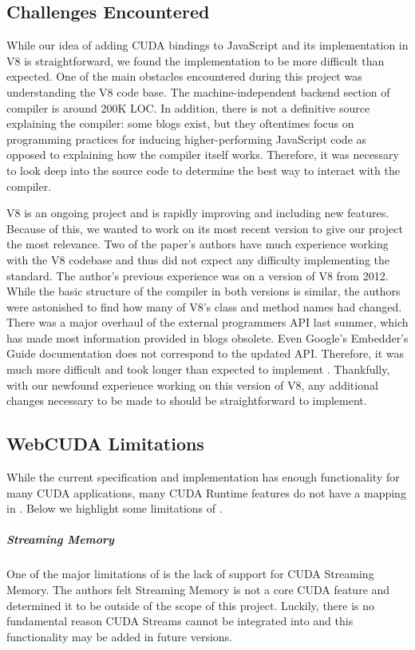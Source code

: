 

\subsection{Challenges Encountered} \label{challenges} While our idea of adding
CUDA bindings to JavaScript and its implementation in V8 is straightforward,
we found the implementation to be more difficult than expected.  One of the main obstacles
encountered during this project was understanding the V8 code base. The
machine-independent backend section of compiler is around 200K LOC. In addition,
there is not a definitive source explaining the compiler: some blogs exist, but
they oftentimes focus on programming practices for inducing higher-performing
JavaScript code as opposed to explaining how the compiler itself works.
Therefore, it was necessary to look deep into the source code to determine the
best way to interact with the compiler.

V8 is an ongoing project and is rapidly improving and including new features.
Because of this, we wanted to work on its most recent version to give our
project the most relevance.  Two of the paper's authors have much experience
working with the V8 codebase and thus did not expect any difficulty implementing
the \name standard.  The author's previous experience was on a version of V8
from 2012.  While the basic structure of the compiler in both versions is
similar, the authors were astonished to find how many of V8's class and method
names had changed. There was a major overhaul of the external programmers API
last summer, which has made most information provided in blogs obsolete. Even
Google's Embedder's Guide documentation \cite{embeddersGuide} does not
correspond to the updated API.  Therefore, it was much more difficult and took
longer than expected to implement \namens. Thankfully, with our newfound
experience working on this version of V8, any additional changes necessary to be
made to \name should be straightforward to implement.

\subsection{WebCUDA Limitations}
While the current \name specification and implementation has enough
functionality for many CUDA applications, many CUDA Runtime features do not
have a mapping in \namens. Below we highlight some limitations of \namens.

\subparagraph{Streaming Memory} One of the major limitations of \name is the
lack of support for CUDA Streaming Memory. The authors felt Streaming Memory is
not a core CUDA feature and determined it to be outside of the scope of this project.
Luckily, there is no fundamental reason CUDA Streams cannot be integrated into
\name and this functionality may be added in future versions.

